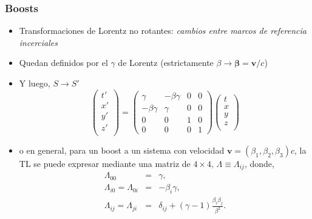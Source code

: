 \documentclass[xetex,mathserif,serif,10pt]{beamer}
\begin{document}
\begin{frame}
  \frametitle{Boosts}
  \begin{itemize}
    \item Transformaciones de Lorentz no rotantes: {\emph{cambios entre marcos de referencia incerciales}}
    \item Quedan definidos por el $\gamma$ de Lorentz (estrictamente $\beta \to \mathbf{\beta}=\mathbf{v}/c$)
    \item Y luego, $S \to S'$
    \begin{equation}\label{EQboost}
      \left (
        \begin{array}{c}
          t' \\
          x' \\
          y' \\
          z' \\
        \end{array}
      \right ) 
      = 
      \left (
        \begin{array}{cccc}
          \gamma & -\beta\gamma & 0 & 0 \\
          -\beta\gamma & \gamma & 0 & 0 \\
          0 & 0 & 1 & 0 \\
          0 & 0 & 0 & 1
        \end{array}
      \right )
      \left (
        \begin{array}{c}
          t \\
          x \\
          y \\
          z \\
        \end{array}
      \right ) 
    \end{equation}
  \item o en general, para un boost a un sistema con velocidad $\mathbf{v}=(\beta_1, \beta_2, \beta_3) c$, la TL se puede expresar mediante una matriz de $4\times4$, $\Lambda\equiv\Lambda_{ij}$, donde,
    \begin{eqnarray*}
      \Lambda_{00} &=& \gamma,\\
      \Lambda_{i0}=\Lambda_{0i} &=& -\beta_i \gamma,\\
      \Lambda_{ij}=\Lambda_{ji} &=& \delta_{ij} + (\gamma - 1) \frac{\beta_i \beta_j}{\beta^2}.
    \end{eqnarray*}
  \end{itemize}
\end{frame}
\end{document}
